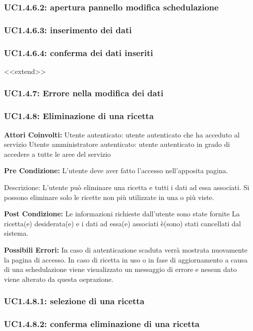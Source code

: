 \subsubsection{UC1.4.6.2: apertura pannello modifica schedulazione}
\subsubsection{UC1.4.6.3: inserimento dei dati}
\subsubsection{UC1.4.6.4: conferma dei dati inseriti}
<<extend>>
\subsubsection{UC1.4.7: Errore nella modifica dei dati}

\subsubsection{UC1.4.8: Eliminazione di una ricetta}

\textbf{Attori Coinvolti:}
Utente autenticato: utente autenticato che ha acceduto al servizio
Utente amministratore autenticato: utente autenticato in grado di accedere a tutte le aree del servizio

\textbf{Pre Condizione:}
        L’utente deve aver fatto l’accesso nell’apposita pagina.

Descrizione:
L’utente può eliminare una ricetta e tutti i dati ad essa associati.
Si possono eliminare solo le ricette non più utilizzate in una o più viste.    

\textbf{Post Condizione:}
        Le informazioni richieste dall’utente sono state fornite
La ricetta(e) desiderata(e) e i dati ad essa(e) associati è(sono) stati cancellati dal sistema.

\textbf{Possibili Errori:}
In caso di autenticazione scaduta verrà mostrata nuovamente la pagina di accesso.
In caso di ricetta in uso o in fase di aggiornamento a causa di una schedulazione viene visualizzato un messaggio di errore e nessun dato viene alterato da questa oeprazione.


\subsubsection{UC1.4.8.1: selezione di una ricetta}
\subsubsection{UC1.4.8.2: conferma eliminazione di una ricetta}

